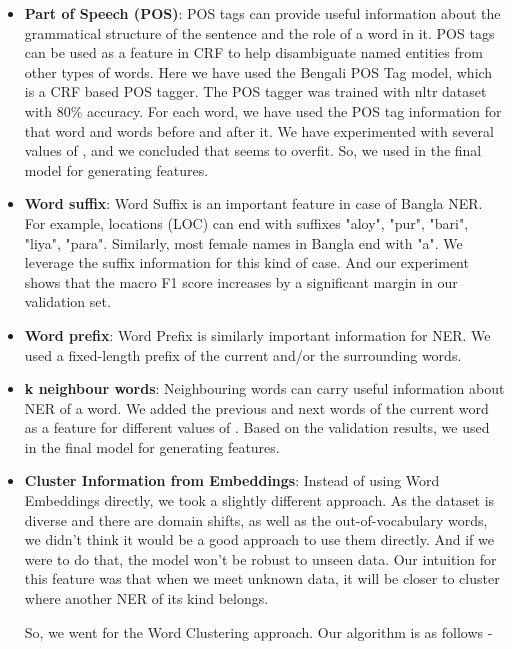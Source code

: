 \documentclass{article}
\begin{document}
\begin{itemize}
\item \textbf{Part of Speech (POS)}: POS tags can provide useful information about the grammatical structure of the sentence and the role of a word in it. POS tags can be used as a feature in CRF to help disambiguate named entities from other types of words. Here we have used the Bengali POS Tag model, which is a CRF based POS tagger. The POS tagger was trained with nltr dataset with 80\% accuracy. For each word, we have used the POS tag information for that word and  words before and after it. We have experimented with several values of , and we concluded that  seems to overfit. So, we used  in the final model for generating features.

\item \textbf{Word suffix}: Word Suffix is an important feature in case of Bangla NER. For example, locations (LOC) can end with suffixes "aloy", "pur", "bari", "liya", "para". Similarly, most female names in Bangla end with "a". We leverage the suffix information for this kind of case. And our experiment shows that the macro F1 score increases by a significant margin in our validation set.

\item \textbf{Word prefix}: Word Prefix is similarly important information for NER. We used a fixed-length prefix of the current and/or the surrounding words.

\item \textbf{k neighbour words}: Neighbouring words can carry useful information about NER of a word. 
We added the previous and next  words of the current word as a feature for different values of . Based on the validation results, we used  in the final model for generating features.

\item \textbf{Cluster Information from Embeddings}: Instead of using Word Embeddings directly, we took a slightly different approach. As the dataset is diverse and there are domain shifts, as well as the out-of-vocabulary words, we didn't think it would be a good approach to use them directly. And if we were to do that, the model won't be robust to unseen data. Our intuition for this feature was that when we meet unknown data, it will be closer to cluster where another NER of its kind belongs.

So, we went for the Word Clustering \cite{mishra2016semi} approach. Our algorithm is as follows - 


\end{itemize}
\end{document}
